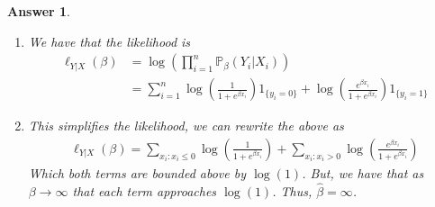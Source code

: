 \documentclass[12pt]{article}
\theoremstyle{colon}
\newtheorem*{answer}{Answer}
\begin{document}
\begin{answer}
\begin{enumerate}[label=\arabic*)]
\begin{enumerate}[label=\alph*)]
      \item We have that the likelihood is
        \begin{align*}
          \ell_{Y|X}(\beta) &= \log(\prod_{i=1}^n \mathbb{P}_\beta(Y_i|X_i)) \\
          &= \sum_{i=1}^n \log \left( \frac{1}{1+e^{\beta x_i}} \right) 1_{\{y_i = 0\}} + \log \left( \frac{e^{\beta x_i}}{1+e^{\beta x_i}} \right) 1_{\{y_i = 1\}}
        \end{align*}

      \item This simplifies the likelihood, we can rewrite the above as
        \begin{gather*}
          \ell_{Y|X}(\beta) = \sum_{x_i : x_i \leq 0} \log \left( \frac{1}{1+e^{\beta x_i}} \right) + \sum_{x_i : x_i > 0} \log \left( \frac{e^{\beta x_i}}{1+e^{\beta x_i}} \right)
        \end{gather*}
        Which both terms are bounded above by $\log(1)$. But, we have that as $\beta \rightarrow \infty$ that each term approaches $\log(1)$. Thus, $\hat{\beta}=\infty$.
    \end{enumerate}
  \end{enumerate}
\end{answer}
\end{document}
